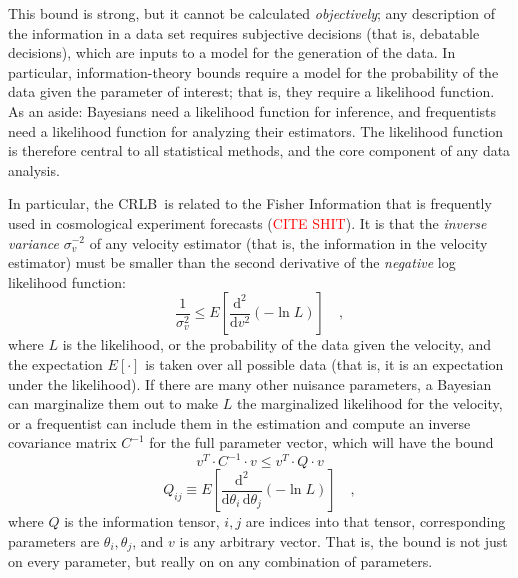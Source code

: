 \documentclass[modern]{aastex61}
\newcommand{\dd}{\mathrm{d}}
\newcommand{\todo}[1]{\textcolor{red}{#1}}  %
\newcommand{\acronym}[1]{{\small{#1}}}
\newcommand{\CRLB}{\acronym{CRLB}}
\begin{document}
This bound is strong, but it cannot be calculated \emph{objectively};
any description of the information in a data set requires
subjective decisions (that is, debatable decisions), which are inputs
to a model for the generation of the data.
In particular, information-theory bounds require a model for the
probability of the data given the parameter of interest; that is, they
require a likelihood function.
As an aside: Bayesians need a likelihood function for inference, and
frequentists need a likelihood function for analyzing their estimators.
The likelihood function is therefore central to all statistical methods,
and the core component of any data analysis.

In particular, the \CRLB\ is related to the Fisher Information that is
frequently used in cosmological experiment forecasts (\todo{CITE
  SHIT}).
It is that the \emph{inverse variance} $\sigma_v^{-2}$ of any velocity
estimator (that is, the information in the velocity estimator) must be smaller than the
second derivative of the \emph{negative} log likelihood function:
\begin{equation}
\frac{1}{\sigma_v^2} \leq E\left[\frac{\dd^2}{\dd v^2}(-\ln L)\right] \quad,
\end{equation}
where $L$ is the likelihood, or the probability of the data given the velocity,
and the expectation $E[\cdot]$ is taken over all possible data (that is, it is an
expectation under the likelihood).
If there are many other nuisance parameters, a Bayesian can marginalize them
out to make $L$ the marginalized likelihood for the velocity, or a frequentist
can include them in the estimation and compute an inverse covariance matrix $C^{-1}$
for the full parameter vector, which will have the bound
\begin{equation}
v^T\cdot C^{-1}\cdot v \leq v^T\cdot Q\cdot v
\end{equation}
\begin{equation}
Q_{ij} \equiv E\left[\frac{\dd^2}{\dd\theta_i\,\dd\theta_j}(-\ln L)\right] \quad,
\end{equation}
where $Q$ is the information tensor, $i,j$ are indices into that
tensor, corresponding parameters are $\theta_i, \theta_j$, and $v$ is
any arbitrary vector.  That is, the bound is not just on every
parameter, but really on on any combination of parameters.
\end{document}
